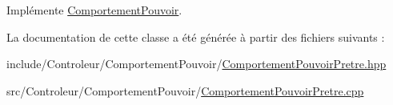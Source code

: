 \-Implémente \hyperlink{class_comportement_pouvoir_a8b8f4e753291ab73ab0016106f3948ff}{\-Comportement\-Pouvoir}.



\-La documentation de cette classe a été générée à partir des fichiers suivants \-:\begin{DoxyCompactItemize}
\item 
include/\-Controleur/\-Comportement\-Pouvoir/\hyperlink{_comportement_pouvoir_pretre_8hpp}{\-Comportement\-Pouvoir\-Pretre.\-hpp}\item 
src/\-Controleur/\-Comportement\-Pouvoir/\hyperlink{_comportement_pouvoir_pretre_8cpp}{\-Comportement\-Pouvoir\-Pretre.\-cpp}\end{DoxyCompactItemize}
